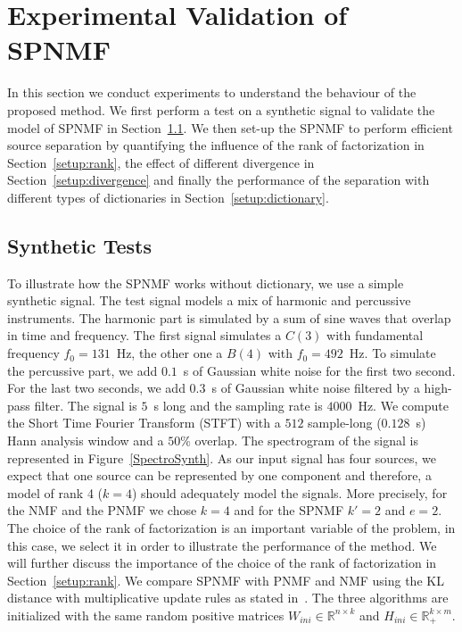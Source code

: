 \section{Experimental Validation of SPNMF}
\label{sec:experiments}

In this section we conduct experiments to understand the behaviour of the proposed method. We first perform a test on a synthetic signal to validate the model of SPNMF in Section~\ref{SynthTest}. We then set-up the SPNMF to perform efficient source separation by quantifying the influence of the rank of factorization in Section~\ref{setup:rank}, the effect of different divergence in  Section~\ref{setup:divergence} and finally the performance of the separation with different types of dictionaries in  Section~\ref{setup:dictionary}.


\subsection{Synthetic Tests}\label{SynthTest}

To illustrate how the SPNMF works without dictionary, we use a simple synthetic signal. The test signal models a mix of harmonic and percussive instruments. The harmonic part is simulated by a sum of sine waves that overlap in time and frequency. The first signal simulates a $C(3)$ with fundamental frequency $f_0 = 131$~Hz, the other one a $B(4)$ with $f_0 = 492$~Hz. To simulate the percussive part, we add $0.1$~s of Gaussian white noise for the first two second. For the last two seconds, we add $0.3$~s of Gaussian white noise filtered by a high-pass filter. The signal is $5$~s long and the sampling rate is $4000$~Hz. We compute the Short Time Fourier Transform (STFT) with a $512$ sample-long ($0.128$~s) Hann analysis window and a $50\%$ overlap. The spectrogram of the signal is represented in Figure~\ref{SpectroSynth}. As our input signal has four sources, we expect that one source can be represented by one component and therefore, a model of rank 4 ($k=4$) should adequately model the signals. More precisely, for the NMF and the PNMF we chose $k=4$ and for the SPNMF $k'=2$ and $e=2$. The choice of the rank of factorization is an important variable of the problem, in this case, we select it in order to illustrate the performance of the method. We will further discuss the importance of the choice of the rank of factorization in Section~\ref{setup:rank}. We compare SPNMF with PNMF and NMF using the KL distance with multiplicative update rules as stated in~\cite{fevotte2009nonnegative}. The three algorithms are initialized with the same random positive matrices $W_{ini} \in \mathbb{R}^{n \times k}$  and $ H_{ini} \in \mathbb{R}^{k \times m}_{+} $.

